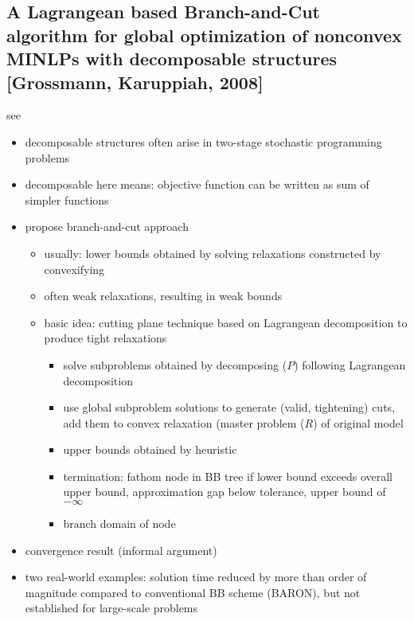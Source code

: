 \documentclass{article}
\begin{document}
\subsection{A Lagrangean based Branch-and-Cut algorithm for global optimization of nonconvex MINLPs with decomposable structures [Grossmann, Karuppiah, 2008]}
see \cite{karuppiah2008lagrangean}
\begin{itemize}
\item decomposable structures often arise in two-stage stochastic programming problems
\item decomposable here means: objective function can be written as sum of simpler functions
\item propose branch-and-cut approach
	\begin{itemize}
	\item usually: lower bounds obtained by solving relaxations constructed by convexifying
	\item often weak relaxations, resulting in weak bounds
	\item basic idea: cutting plane technique based on Lagrangean decomposition to produce tight relaxations
		\begin{itemize}
		\item solve subproblems obtained by decomposing ($P$) following Lagrangean decomposition
		\item use global subproblem solutions to generate (valid, tightening) cuts, add them to convex relaxation (master problem ($R$) of original model
		\item upper bounds obtained by heuristic
		\item termination: fathom node in BB tree if lower bound exceeds overall upper bound, approximation gap below tolerance, upper bound of $-\infty$
		\item branch domain of node
		\end{itemize}
	\end{itemize}
\item convergence result (informal argument)
\item two real-world examples: solution time reduced by more than order of magnitude compared to conventional BB scheme (BARON), but not established for large-scale problems
\end{itemize}
\end{document}
